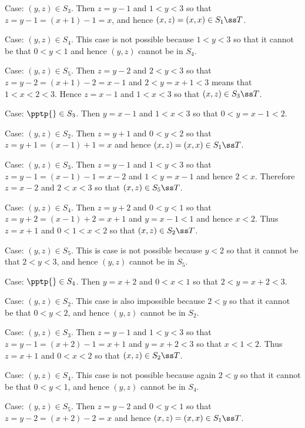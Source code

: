 {{\begin{indpar}
      Case: $(y,z) \in S_3$.
      Then $z = y-1$ and $1 < y < 3$ so that $z = y-1 = (x+1)-1 = x$, and hence $(x,z) = (x,x) \in S_1 \ss T$.

      Case: $(y,z) \in S_4$.
      This case is not possible because $1 < y < 3$ so that it cannot be that $0 < y < 1$ and hence $(y,z)$ cannot be in $S_4$.

      Case: $(y,z) \in S_5$.
      Then $z = y-2$ and $2 < y < 3$ so that $z = y-2 = (x+1)-2 = x-1$ and $2 < y = x+1 < 3$ means that $1 < x < 2 < 3$.
      Hence $z=x-1$ and $1 < x < 3$ so that $(x,z) \in S_3 \ss T$.
    \end{indpar}

    Case: $\pptp{} \in S_3$.
    Then $y=x-1$ and $1 < x < 3$ so that $0 < y = x-1 < 2$.
    \begin{indpar}
      Case: $(y,z) \in S_2$.
      Then $z = y+1$ and $0 < y < 2$ so that $z = y+1 = (x-1)+1 = x$ and hence $(x,z) = (x,x) \in S_1 \ss T$.

      Case: $(y,z) \in S_3$.
      Then $z = y-1$ and $1 < y < 3$ so that $z = y-1 = (x-1)-1 = x-2$ and $1 < y = x-1$ and hence $2 < x$.
      Therefore $z = x-2$ and $2 < x < 3$ so that $(x,z) \in S_5 \ss T$.

      Case: $(y,z) \in S_4$.
      Then $z=y+2$ and $0 < y < 1$ so that $z = y+2 = (x-1)+2 = x+1$ and $y = x-1 < 1$ and hence $x < 2$.
      Thus $z = x+1$ and $0 < 1 < x < 2$ so that $(x,z) \in S_2 \ss T$.

      Case: $(y,z) \in S_5$.
      This is case is not possible because $y < 2$ so that it cannot be that $2 < y < 3$, and hence $(y,z)$ cannot be in $S_5$.
    \end{indpar}

    Case: $\pptp{} \in S_4$.
    Then $y=x+2$ and $0 < x < 1$ so that $2 < y = x+2 < 3$.
    \begin{indpar}
      Case: $(y,z) \in S_2$.
      This case is also impossible because $2 < y$  so that it cannot be that $0 < y < 2$, and hence $(y,z)$ cannot be in $S_2$.

      Case: $(y,z) \in S_3$.
      Then $z = y-1$ and $1 < y < 3$ so that $z = y-1 = (x+2)-1 = x+1$ and $y = x+2 < 3$ so that $x < 1 < 2$.
      Thus $z = x+1$ and $0 < x < 2$ so that $(x,z) \in S_2 \ss T$.

      Case: $(y,z) \in S_4$.
      This case is not possible because again $2 < y$ so that it cannot be that $0 < y < 1$, and hence $(y,z)$ cannot be in $S_4$.

      Case: $(y,z) \in S_5$.
      Then $z=y-2$ and $0 < y <1$ so that $z=y-2=(x+2)-2=x$ and hence $(x,z) = (x,x) \in S_1 \ss T$.
    \end{indpar}

}}
